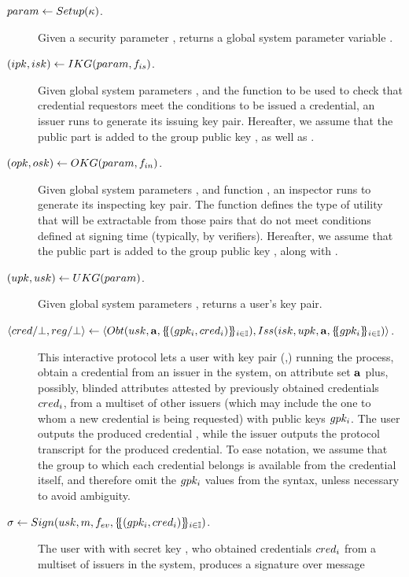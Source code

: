 \begin{description}
\item[$param \gets Setup(\kappa)$.] Given a security parameter \secpar,
  returns a global system parameter variable \parm.
\item[$(ipk,isk) \gets IKG(param,f_{is})$.] Given global system
  parameters \parm, and the function \fissue to be used to check that credential
  requestors meet the conditions to be issued a credential, an issuer runs
  \IKeyGen to generate its issuing key pair. Hereafter, we assume that the
  public part \ipk is added to the group public key \gpk, as well as \fissue.
\item[$(opk,osk) \gets OKG(param,f_{in})$.] Given global system
  parameters \parm, and function \finsp, an inspector runs \OKeyGen to generate
  its inspecting key pair. The function \finsp defines the type of utility that
  will be extractable from those pairs that do not meet conditions defined
  at signing time (typically, by verifiers). Hereafter, we assume that the
  public part \opk is added to the group public key \gpk, along with \finsp.
\item[$(upk,usk) \gets UKG(param)$.] Given global system parameters
  \parm, returns a user's key pair.
\item[$\langle cred/\bot,reg/\bot \rangle \gets
  \langle
  Obt(usk,\mathbf{a},\{\mskip-5mu\{ (gpk_i,cred_i)\}\mskip-5mu\}_{i \in \mathbb{I}}),
  Iss(isk,upk,\mathbf{a},\{\mskip-5mu\{ gpk_i \}\mskip-5mu\}_{i \in \mathbb{I}})
  \rangle$.] %
  This interactive protocol lets a user with key pair (\upk,\usk) running the
  \Obtain process, obtain a credential \cred from an issuer in the system, on
  attribute set $\mathbf{a}$ plus, possibly, blinded attributes attested by
  previously obtained credentials $cred_i$, from a multiset of other issuers
  (which may include the one to whom a new credential is being requested) with
  public keys $gpk_i$. The user outputs the produced credential \cred, while
  the issuer outputs the protocol transcript \utrans for the produced
  credential. To ease notation, we assume that the group to which each
  credential belongs is available from the credential itself, and therefore
  omit the $gpk_i$ values from the syntax, unless necessary to avoid ambiguity.
\item[$\sigma \gets Sign(usk,m,f_{ev},
  \{\mskip-5mu\{ (gpk_i,cred_i)\}\mskip-5mu\}_{i \in \mathbb{I}})$.]
  The user with with secret key \usk, who obtained credentials $cred_i$ from a
  multiset of issuers in the system, produces a signature \sig over message

\end{description}
